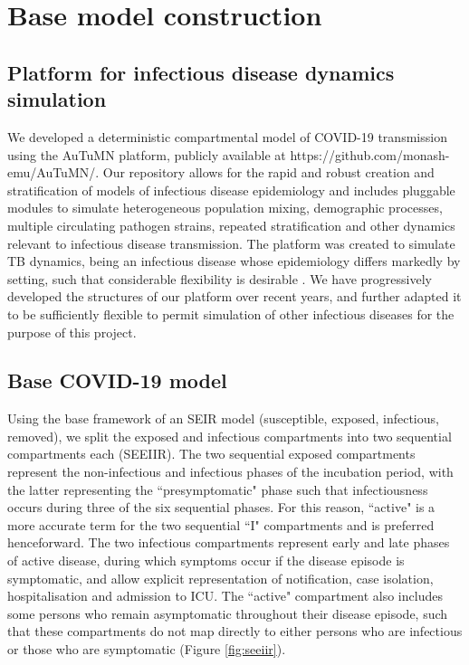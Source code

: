
\section{Base model construction}
\subsection{Platform for infectious disease dynamics simulation}

We developed a deterministic compartmental model of COVID-19 transmission using the AuTuMN platform,
publicly available at https://github.com/monash-emu/AuTuMN/.
Our repository allows for the rapid and robust creation and stratification of models of infectious disease epidemiology
and includes pluggable modules to simulate heterogeneous population mixing, demographic processes, multiple circulating
pathogen strains, repeated stratification and other dynamics relevant to infectious disease transmission.
The platform was created to simulate TB dynamics, being an infectious disease whose epidemiology differs markedly
by setting, such that considerable flexibility is desirable \cite{RN18}.
We have progressively developed the structures of our platform over recent years,
and further adapted it to be sufficiently flexible
to permit simulation of other infectious diseases for the purpose of this project.

\subsection{Base COVID-19 model}
Using the base framework of an SEIR model (susceptible, exposed, infectious, removed), we split the exposed and infectious compartments into two sequential compartments each (SEEIIR). The two sequential exposed compartments represent the non-infectious and infectious phases of the incubation period, with the latter representing the ``presymptomatic" phase such that infectiousness occurs during three of the six sequential phases. For this reason, ``active" is a more accurate term for the two sequential ``I" compartments and is preferred henceforward. The two infectious compartments represent early and late phases of active disease, during which symptoms occur if the disease episode is symptomatic, and allow explicit representation of notification, case isolation, hospitalisation and admission to ICU. The ``active" compartment also includes some persons who remain asymptomatic throughout their disease episode, such that these compartments do not map directly to either persons who are infectious or those who are symptomatic (Figure \ref{fig:seeiir}).

